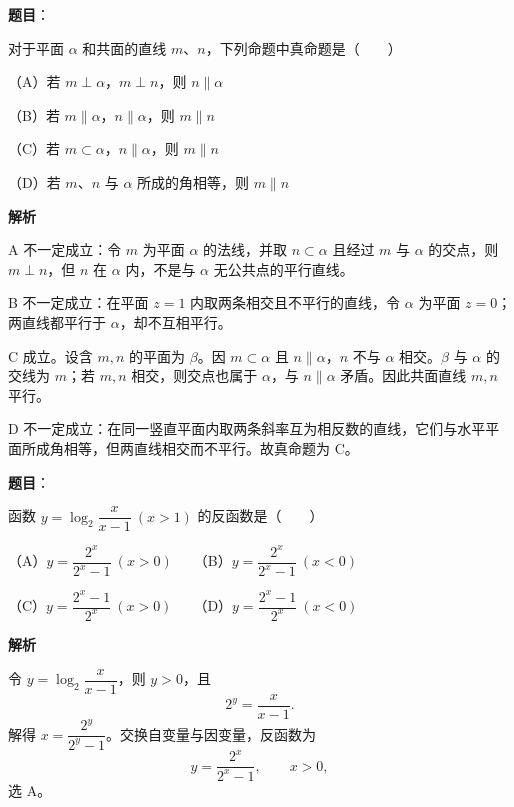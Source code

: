 \begin{answer}

\textbf{题目}：

对于平面 $\alpha$ 和共面的直线 $m$、$n$，下列命题中真命题是\mbox{（　　）}

（A）若 $m\perp\alpha$，$m\perp n$，则 $n\parallel\alpha$

（B）若 $m\parallel\alpha$，$n\parallel\alpha$，则 $m\parallel n$

（C）若 $m\subset\alpha$，$n\parallel\alpha$，则 $m\parallel n$

（D）若 $m$、$n$ 与 $\alpha$ 所成的角相等，则 $m\parallel n$

\textbf{解析}

A 不一定成立：令 $m$ 为平面 $\alpha$ 的法线，并取 $n\subset\alpha$ 且经过 $m$ 与 $\alpha$ 的交点，则 $m\perp n$，但 $n$ 在 $\alpha$ 内，不是与 $\alpha$ 无公共点的平行直线。

B 不一定成立：在平面 $z=1$ 内取两条相交且不平行的直线，令 $\alpha$ 为平面 $z=0$；两直线都平行于 $\alpha$，却不互相平行。

C 成立。设含 $m,n$ 的平面为 $\beta$。因 $m\subset\alpha$ 且 $n\parallel\alpha$，$n$ 不与 $\alpha$ 相交。$\beta$ 与 $\alpha$ 的交线为 $m$；若 $m,n$ 相交，则交点也属于 $\alpha$，与 $n\parallel\alpha$ 矛盾。因此共面直线 $m,n$ 平行。

D 不一定成立：在同一竖直平面内取两条斜率互为相反数的直线，它们与水平平面所成角相等，但两直线相交而不平行。故真命题为 C。


\end{answer}
\begin{answer}

\textbf{题目}：

函数 $y=\log_2\dfrac{x}{x-1}\ (x>1)$ 的反函数是\mbox{（　　）}

（A）$y=\dfrac{2^x}{2^x-1}\ (x>0)$　　（B）$y=\dfrac{2^x}{2^x-1}\ (x<0)$

（C）$y=\dfrac{2^x-1}{2^x}\ (x>0)$　　（D）$y=\dfrac{2^x-1}{2^x}\ (x<0)$

\textbf{解析}

令 $y=\log_2\dfrac{x}{x-1}$，则 $y>0$，且
\nopagebreak[4]
\[
2^y=\frac{x}{x-1}.
\]
解得 $x=\dfrac{2^y}{2^y-1}$。交换自变量与因变量，反函数为
\nopagebreak[4]
\[
y=\frac{2^x}{2^x-1},\qquad x>0,
\]
选 A。


\end{answer}
